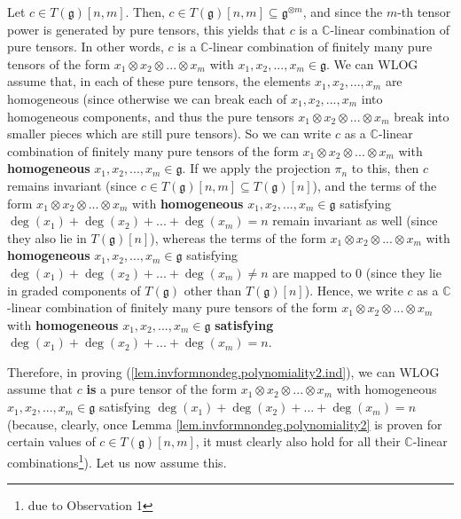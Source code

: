 \documentclass
[numbers=enddot,12pt,final,onecolumn,german,notitlepage]{scrartcl}%
\theoremstyle{definition}
\begin{document}
Let $c\in T\left(  \mathfrak{g}\right)  \left[  n,m\right]  $. Then, $c\in
T\left(  \mathfrak{g}\right)  \left[  n,m\right]  \subseteq\mathfrak{g}%
^{\otimes m}$, and since the $m$-th tensor power is generated by pure tensors,
this yields that $c$ is a $\mathbb{C}$-linear combination of pure tensors. In
other words, $c$ is a $\mathbb{C}$-linear combination of finitely many pure
tensors of the form $x_{1}\otimes x_{2}\otimes...\otimes x_{m}$ with
$x_{1},x_{2},...,x_{m}\in\mathfrak{g}$. We can WLOG assume that, in each of
these pure tensors, the elements $x_{1},x_{2},...,x_{m}$ are homogeneous
(since otherwise we can break each of $x_{1},x_{2},...,x_{m}$ into homogeneous
components, and thus the pure tensors $x_{1}\otimes x_{2}\otimes...\otimes
x_{m}$ break into smaller pieces which are still pure tensors). So we can
write $c$ as a $\mathbb{C}$-linear combination of finitely many pure tensors
of the form $x_{1}\otimes x_{2}\otimes...\otimes x_{m}$ with
\textbf{homogeneous }$x_{1},x_{2},...,x_{m}\in\mathfrak{g}$. If we apply the
projection $\pi_{n}$ to this, then $c$ remains invariant (since $c\in T\left(
\mathfrak{g}\right)  \left[  n,m\right]  \subseteq T\left(  \mathfrak{g}%
\right)  \left[  n\right]  $), and the terms of the form $x_{1}\otimes
x_{2}\otimes...\otimes x_{m}$ with \textbf{homogeneous }$x_{1},x_{2}%
,...,x_{m}\in\mathfrak{g}$ satisfying $\deg\left(  x_{1}\right)  +\deg\left(
x_{2}\right)  +...+\deg\left(  x_{m}\right)  =n$ remain invariant as well
(since they also lie in $T\left(  \mathfrak{g}\right)  \left[  n\right]  $),
whereas the terms of the form $x_{1}\otimes x_{2}\otimes...\otimes x_{m}$ with
\textbf{homogeneous }$x_{1},x_{2},...,x_{m}\in\mathfrak{g}$ satisfying
$\deg\left(  x_{1}\right)  +\deg\left(  x_{2}\right)  +...+\deg\left(
x_{m}\right)  \neq n$ are mapped to $0$ (since they lie in graded components
of $T\left(  \mathfrak{g}\right)  $ other than $T\left(  \mathfrak{g}\right)
\left[  n\right]  $). Hence, we write $c$ as a $\mathbb{C}$-linear combination
of finitely many pure tensors of the form $x_{1}\otimes x_{2}\otimes...\otimes
x_{m}$ with \textbf{homogeneous }$x_{1},x_{2},...,x_{m}\in\mathfrak{g}$
\textbf{satisfying} $\deg\left(  x_{1}\right)  +\deg\left(  x_{2}\right)
+...+\deg\left(  x_{m}\right)  =n$.

Therefore, in proving (\ref{lem.invformnondeg.polynomiality2.ind}), we can
WLOG assume that $c$ \textbf{is} a pure tensor of the form $x_{1}\otimes
x_{2}\otimes...\otimes x_{m}$ with homogeneous\textbf{ }$x_{1},x_{2}%
,...,x_{m}\in\mathfrak{g}$ satisfying $\deg\left(  x_{1}\right)  +\deg\left(
x_{2}\right)  +...+\deg\left(  x_{m}\right)  =n$ (because, clearly, once Lemma
\ref{lem.invformnondeg.polynomiality2} is proven for certain values of $c\in
T\left(  \mathfrak{g}\right)  \left[  n,m\right]  $, it must clearly also hold
for all their $\mathbb{C}$-linear combinations\footnote{due to Observation
1}). Let us now assume this.
\end{document}

